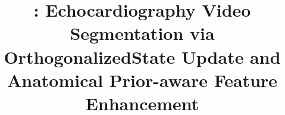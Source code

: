 \documentclass[10pt,twocolumn,letterpaper]{article}
\title{
\mymodel: Echocardiography Video Segmentation via \\ OrthogonalizedState Update and Anatomical Prior-aware Feature Enhancement
}
\begin{document}
\maketitle

                

                
                


    
                
    

                
                
    
                
                
                
    


                



{
    \small
    
    
}



% 
\end{document}
